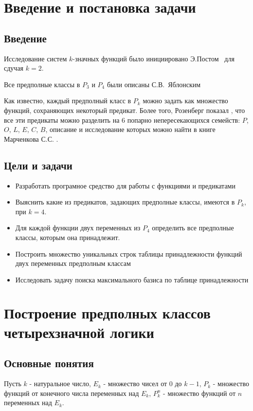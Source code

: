 \documentclass[a4paper,14pt]{extreport}
\begin{document}
\newpage
\tableofcontents
\newpage
\chapter{ Введение и постановка задачи }

\section{Введение}
Исследование систем $k$-значных функций было инициировано Э.Постом~\cite{post1,post2} для сдучая $k=2$.

Все предполные классы в $P_3$ и $P_4$ были описаны С.В.~Яблонским\cite{yabl}

Как известно, каждый предполный класс в $P_k$ можно задать как множество функций, сохраняющих некоторый предикат. Более того, Розенберг показал \cite{roz1, roz2}, что все эти предикаты можно разделить на 6 попарно непересекающихся семейств: $P$, $O$, $L$, $E$, $C$, $B$, описание и исследование которых можно найти в книге Марченкова С.С. \cite{march}. 

\section{Цели и задачи}

\begin{itemize}
\item Разработать програмное средство для работы с функциями и предикатами
\item Выяснить какие из предикатов, задающих предполные классы, имеются в $P_k$, при $k=4$.
\item Для каждой функции двух переменных из $P_4$ определить все предполные классы, которым она принадлежит.
\item Построить множество уникальных строк таблицы принадлежности функций двух переменных предполным классам
\item Исследовать задачу поиска максимального базиса по таблице принадлежности
\end{itemize}

 
\newpage
\chapter{Построение предполных классов четырехзначной логики}
\section{Основные понятия}
Пусть $k$ - натуральное число, $E_k$ - множество чисел от 0 до $k-1$, $P_k$ - множество функций от конечного числа переменных над $E_k$, $P_k^n$ - множество функций от $n$ переменных над $E_k$.  
\end{document}
